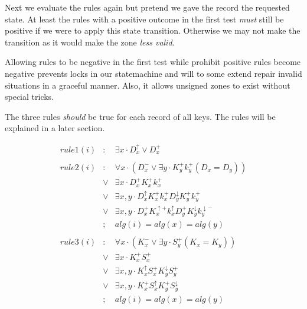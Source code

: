 \documentclass[twoside, a4paper]{article}
\begin{document}
Next we evaluate the rules again but pretend we gave the record the 
requested state. At least the rules with a positive outcome in the 
first test \emph{must} still be positive if we were to apply this 
state transition. Otherwise we may not make the transition as it 
would make the zone \emph{less valid}.

Allowing rules to be negative in the first test while prohibit positive
rules become negative prevents locks in our statemachine and will to
some extend repair invalid situations in a graceful manner. Also, it 
allows unsigned zones to exist without special tricks.

The three rules \emph{should} be true for each record of all keys. The 
rules will be explained in a later section.

\newcommand{\record}[3]{#1_{#2}^{#3}}

\newcommand{\A}[2]{\record{D}{#1}{#2}}
\newcommand{\B}[2]{\record{K}{#1}{#2}}
\newcommand{\C}[2]{\record{k}{#1}{#2}}
\newcommand{\D}[2]{\record{S}{#1}{#2}}

\begin{eqnarray}
\label{eqn:rule1}
rule1(i)
&:& 	\exists x\cdot\A{x}{\uparrow} \vee \A{x}{+}\\
\nonumber
\\
\label{eqn:rule2}
rule2(i)
&:&		\forall x \cdot (\A{x}{-} \vee \exists y \cdot \B{y}{+}\C{y}{+} (\A{x}{}=\A{y}{}) ) \nonumber \\
&\vee& 	\exists x\cdot\A{x}{+} \B{x}{+} \C{x}{+} \nonumber \\
&\vee& 	\exists x,y\cdot\A{x}{\uparrow} \B{x}{+} \C{x}{+} \A{y}{\downarrow} \B{y}{+} \C{y}{+} \\
&\vee&	\exists x,y\cdot \A{x}{+} \B{x}{\uparrow +} \C{x}{\uparrow}	\A{y}{+} \B{y}{\downarrow}\C{y}{\downarrow -} \nonumber \\
&;&		alg(i)=alg(x)=alg(y) \nonumber \\
\nonumber 
\\
\label{eqn:rule3}
rule3(i)
&:&		\forall x \cdot (\B{x}{-} \vee \exists y \cdot \D{y}{+} (\B{x}{}=\B{y}{}) ) \nonumber\\
&\vee&	\exists x\cdot \B{x}{+} \D{x}{+} \nonumber\\
&\vee&	\exists x,y\cdot \B{x}{\uparrow} \D{x}{+} \B{y}{\downarrow} \D{y}{+} \\
&\vee&	\exists x,y\cdot \B{x}{+} \D{x}{\uparrow} \B{y}{+} \D{y}{\downarrow} \nonumber \\
&;&		alg(i)=alg(x)=alg(y) \nonumber 
\end{eqnarray}
\end{document}
